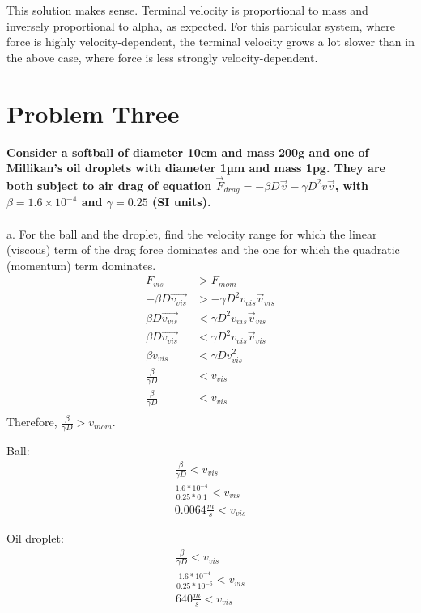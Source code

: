 \documentclass[10pt]{article} %
\begin{document}
This solution makes sense. Terminal velocity is proportional to mass and inversely proportional to alpha, as expected. For this particular system, where force is highly velocity-dependent, the terminal velocity grows a lot slower than in the above case, where force is less strongly velocity-dependent.

\vspace{1 cm}       

\section{Problem Three}
\textbf{Consider a softball of diameter 10cm and mass 200g and one of Millikan’s oil droplets 
with  diameter  1µm  and  mass  1pg.  They  are  both subject  to  air  drag  of  equation
$\vec{F}_{drag} = −\beta D\vec{v} −\gamma D^2v\vec{v}$, with $\beta = 1.6 \times 10^{−4}$ and $\gamma = 0.25$ (SI units).} \\ \\

a. For  the  ball  and  the  droplet,  find  the  velocity  range  for  which  the  linear  (viscous) term of the drag force dominates and the one for which the quadratic (momentum) term dominates.\\

\begin{align}
  F_{vis} &> F_{mom}\\
  -\beta D\vec{v_{vis}} &> -\gamma D^2v_{vis}\vec{v}_{vis}\\
  \beta D\vec{v_{vis}} &< \gamma D^2v_{vis}\vec{v}_{vis}\\
  \beta D\vec{v_{vis}} &< \gamma D^2v_{vis}\vec{v}_{vis}\\
  \beta v_{vis} &< \gamma Dv^2_{vis}\\
  \frac{\beta}{\gamma D} &< v_{vis}\\
  \frac{\beta}{\gamma D} &< v_{vis}\\
\end{align}
Therefore, $\frac{\beta}{\gamma D}  > v_{mom}$.

Ball:
\begin{align}
  \frac{\beta}{\gamma D} < v_{vis}\\
  \frac{1.6*10^{-4}}{0.25*0.1} < v_{vis}\\
  0.0064 \frac{m}{s} < v_{vis}
\end{align}

Oil droplet:
\begin{align}
  \frac{\beta}{\gamma D} < v_{vis}\\
  \frac{1.6*10^{-4}}{0.25*10^{-6}} < v_{vis}\\
  640 \frac{m}{s} < v_{vis}
\end{align}
\end{document}
